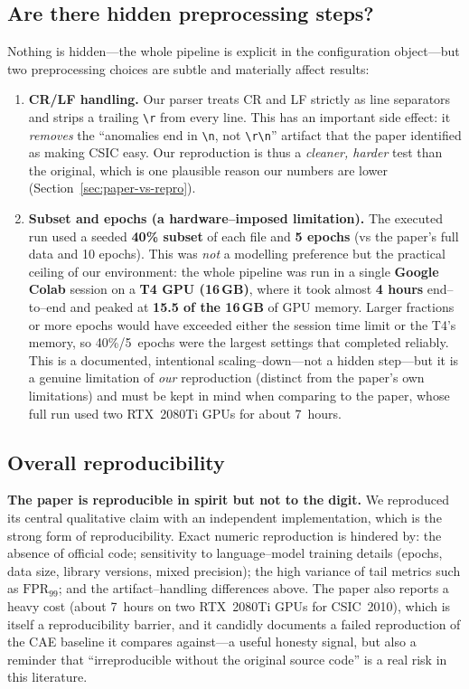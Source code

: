 \documentclass[11pt,a4paper]{article}
\begin{document}
\subsection{Are there hidden preprocessing steps?}
Nothing is hidden---the whole pipeline is explicit in the configuration object---but two
preprocessing choices are subtle and materially affect results:
\begin{enumerate}[nosep,leftmargin=1.4em]
  \item \textbf{CR/LF handling.} Our parser treats CR and LF strictly as line separators
        and strips a trailing \texttt{\textbackslash r} from every line. This has an
        important side effect: it \emph{removes} the ``anomalies end in
        \texttt{\textbackslash n}, not \texttt{\textbackslash r\textbackslash n}''
        artifact that the paper identified as making CSIC easy. Our reproduction is thus a
        \emph{cleaner, harder} test than the original, which is one plausible reason our
        numbers are lower (Section~\ref{sec:paper-vs-repro}).
  \item \textbf{Subset and epochs (a hardware--imposed limitation).} The executed run used
        a seeded \textbf{40\% subset} of each file and \textbf{5 epochs} (vs the paper's
        full data and 10 epochs). This was \emph{not} a modelling preference but the
        practical ceiling of our environment: the whole pipeline was run in a single
        \textbf{Google Colab} session on a \textbf{T4 GPU (16\,GB)}, where it took almost
        \textbf{4 hours} end--to--end and peaked at \textbf{15.5 of the 16\,GB} of GPU
        memory. Larger fractions or more epochs would have exceeded either the session
        time limit or the T4's memory, so 40\%/5~epochs were the largest settings that
        completed reliably. This is a documented, intentional scaling--down---not a hidden
        step---but it is a genuine limitation of \emph{our} reproduction (distinct from the
        paper's own limitations) and must be kept in mind when comparing to the paper,
        whose full run used two RTX~2080Ti GPUs for about 7~hours.
\end{enumerate}

\subsection{Overall reproducibility}
\textbf{The paper is reproducible in spirit but not to the digit.} We reproduced its
central qualitative claim with an independent implementation, which is the strong form of
reproducibility. Exact numeric reproduction is hindered by: the absence of official code;
sensitivity to language--model training details (epochs, data size, library versions,
mixed precision); the high variance of tail metrics such as $\text{FPR}_{99}$; and the
artifact--handling differences above. The paper also reports a heavy cost (about 7~hours on
two RTX~2080Ti GPUs for CSIC~2010), which is itself a reproducibility barrier, and it
candidly documents a failed reproduction of the CAE baseline it compares against---a useful
honesty signal, but also a reminder that ``irreproducible without the original source
code'' is a real risk in this literature.
\end{document}
